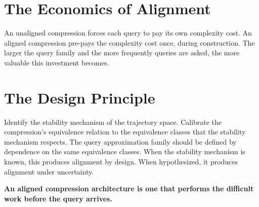 \section{The Economics of Alignment}

An unaligned compression forces each query to pay its own complexity cost. An aligned compression pre-pays the complexity cost once, during construction. The larger the query family and the more frequently queries are asked, the more valuable this investment becomes.

\section{The Design Principle}

Identify the stability mechanism of the trajectory space. Calibrate the compression's equivalence relation to the equivalence classes that the stability mechanism respects. The query approximation family should be defined by dependence on the same equivalence classes. When the stability mechanism is known, this produces alignment by design. When hypothesized, it produces alignment under uncertainty.

\textbf{An aligned compression architecture is one that performs the difficult work before the query arrives.}
